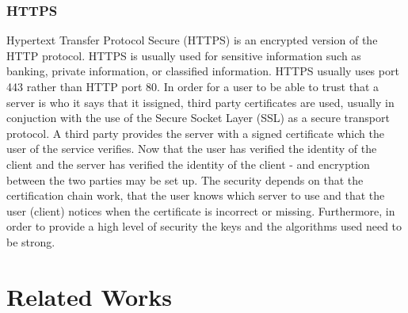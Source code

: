 \subsubsection{HTTPS}
Hypertext Transfer Protocol Secure (HTTPS) is an encrypted version of the HTTP protocol. HTTPS is usually used for sensitive information such as banking, private information, or classified information. HTTPS usually uses port 443 rather than HTTP port 80. In order for a user to be able to trust that a server is who it says that it issigned, third party certificates are used, usually in conjuction with the use of the Secure Socket Layer (SSL) as a secure transport protocol. A third party provides the server with a signed certificate which the user of the service verifies. Now that the user has verified the identity of the client and the server has verified the identity of the client - and encryption between the two parties may be set up. The security depends on that the certification chain work, that the user knows which server to use and that the user (client) notices when the certificate is incorrect or missing. Furthermore, in order to provide a high level of security the keys and the algorithms used need to be strong.

\section{Related Works}
\label{sec:prevWorks}
